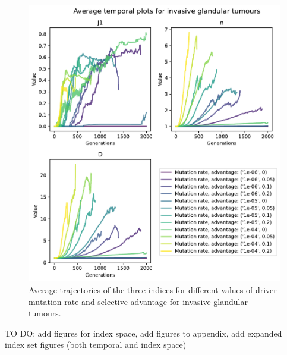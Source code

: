 \begin{figure}
    \centering
    \includegraphics[width=\textwidth]{Chapter_trajectories/figures/inv-gland-temporal.pdf}
    \caption{Average trajectories of the three indices for different values of driver mutation rate and selective advantage for invasive glandular tumours.}
    \label{fig:inv-gland-temporal}
\end{figure}
TO DO: add figures for index space, add figures to appendix, add expanded index set figures (both temporal and index space)

